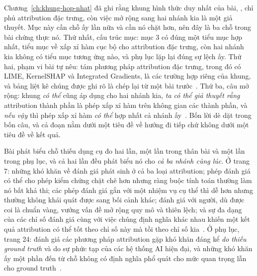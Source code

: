 %
Chương~\ref{ch:khung-hop-nhat} đã ghi rằng khung hình thức duy nhất của bài,
, chỉ phủ attribution đặc
trưng, còn việc mở rộng sang hai nhánh kia là một giả thuyết. Mục này cần chỗ ấy
lần nữa và cần nó chặt hơn, nên đây là ba chỗ trong bài chứng thực nó. Thứ nhất,
cấu trúc mục: mục 3 có đúng một tiểu mục hợp nhất, tiểu mục về xấp xỉ hàm cục bộ
cho attribution đặc trưng, còn hai nhánh kia không có tiểu mục tương ứng nào, và
phụ lục lặp lại đúng sự lệch ấy. Thứ hai, phạm vi bài tự nêu: tám phương pháp
attribution đặc trưng, trong đó có LIME, KernelSHAP và Integrated Gradients, là
các trường hợp riêng của khung, và bảng liệt kê chúng được ghi rõ là chép lại từ
một bài trước~\autocite{p18unified}. Thứ ba, câu mở rộng: khung \emph{có thể}
cũng áp dụng cho hai nhánh kia, \emph{ta có thể giả thuyết rằng} attribution
thành phần là phép xấp xỉ hàm trên không gian các thành phần, và \emph{nếu vậy}
thì phép xấp xỉ hàm \emph{có thể} hợp nhất cả nhánh ấy~\autocite{p18unified}.
Bốn lời dè dặt trong bốn câu, và cả đoạn nằm dưới một tiêu đề về hướng đi tiếp
chứ không dưới một tiêu đề về kết quả.

%
Bài phát biểu chỗ thiếu dụng cụ đo
hai lần, một lần trong thân bài và một lần trong phụ lục, và cả hai lần đều phát
biểu nó cho \emph{cả ba nhánh cùng lúc}. Ở trang 7: những khó khăn về đánh giá
phát sinh ở cả ba loại attribution; phép đánh giá
 có thể cho phép kiểm
chứng chặt chẽ hơn nhưng ràng buộc tính toán thường làm nó bất khả thi; các phép
đánh giá gắn với một nhiệm vụ cụ thể thì dễ hơn nhưng thường không khái quát
được sang bối cảnh khác; đánh giá với người, dù được coi là chuẩn vàng, vướng
vấn đề mở rộng quy mô và thiên lệch; và sự đa dạng của các chỉ số đánh giá cùng
với việc chúng định nghĩa  khác nhau khiến một
kết quả attribution
có thể tốt theo chỉ số này mà tồi theo chỉ số kia~\autocite{p18unified}. Ở phụ
lục, trang 24: đánh giá các phương pháp attribution gặp khó khăn đáng kể
\emph{do thiếu ground truth} và do sự phức tạp của các hệ thống AI hiện đại, và
những khó khăn ấy một phần đến từ chỗ không có định nghĩa phổ quát cho mức quan
trọng lẫn cho ground truth~\autocite{p18unified}.

